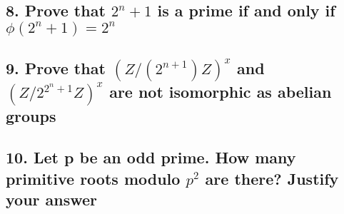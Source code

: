 \documentclass{article}
\begin{document}
\begin{spacing}{1.1}
\vfill

\subsection{8.  Prove that $2^n + 1$ is a prime if and only if $\phi(2^n + 1) = 2^n$}

\vfill

\subsection{9.  Prove that $(Z/(2^{n + 1})Z)^x$ and $(Z/2^{2^n+1}Z)^x$ are not isomorphic as abelian groups} 

\vfill

\subsection{10.  Let p be an odd prime.  How many primitive roots modulo $p^2$ are there? Justify your answer} 

\vfill

\end{spacing}
\end{document}
